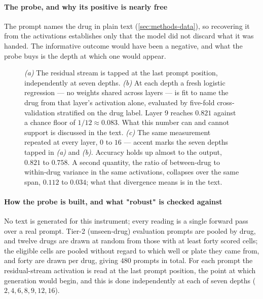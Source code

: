 \paragraph{The probe, and why its positive is nearly free} The prompt names the
drug in plain text (\cref{sec:methods-data}), so recovering it from the
activations establishes only that the model did not discard what it was handed.
The informative outcome would have been a negative, and what the probe buys is
the depth at which one would appear.

\begin{figure}[htbp]
\begin{fullwidth}
\centering
\scalebox{0.96}{}
\caption[Reading the drug out of a layer]{ \emph{(a)} The residual stream is tapped at the last
prompt position, independently at seven depths. \emph{(b)} At each depth a
fresh logistic regression --- no weights shared across layers --- is fit to
name the drug from that layer's activation alone, evaluated by five-fold
cross-validation stratified on the drug label. Layer 9 reaches $0.821$ against
a chance floor of $1/12 \approx 0.083$. What this number can and cannot support
is discussed in the text. \emph{(c)} The same measurement repeated at every
layer, $0$ to $16$ --- accent marks the seven depths tapped in \emph{(a)} and
\emph{(b)}. Accuracy holds up almost to the output, $0.821$ to $0.758$. A
second quantity, the ratio of between-drug to within-drug variance in the same
activations, collapses over the same span, $0.112$ to $0.034$; what that
divergence means is in the text.}
\label{fig:licensing}
\end{fullwidth}
\end{figure}

\paragraph{How the probe is built, and what "robust" is checked against} No text
is generated for this instrument; every reading is a single forward pass over a
real prompt. Tier-2 (unseen-drug) evaluation prompts are pooled by drug, and
twelve drugs are drawn at random from those with at least forty scored cells;
the eligible cells are pooled without regard to which well or plate they came
from, and forty are drawn per drug, giving $480$ prompts in total. For each
prompt the residual-stream activation is read at the last prompt position, the
point at which generation would begin, and this is done independently at each of
seven depths ($2,4,6,8,9,12,16$).

